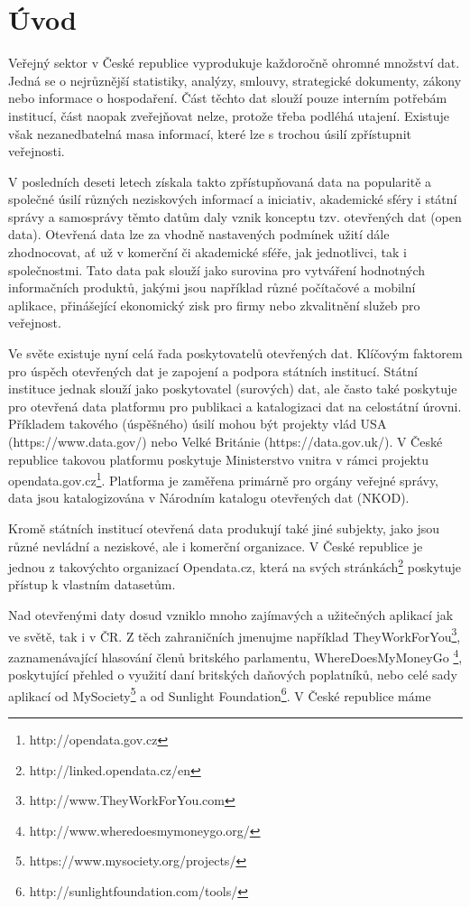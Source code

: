 \chapter*{Úvod}
Veřejný sektor v České republice vyprodukuje každoročně ohromné množství dat. Jedná se o nejrůznější statistiky, analýzy, smlouvy, strategické dokumenty, zákony nebo informace o hospodaření. Část těchto dat slouží pouze interním potřebám institucí, část naopak zveřejňovat nelze, protože třeba podléhá utajení. Existuje však nezanedbatelná masa informací, které lze s trochou úsilí zpřístupnit veřejnosti.

V posledních deseti letech získala takto zpřístupňovaná data na popularitě a společné úsilí různých neziskových informací a iniciativ, akademické sféry i státní správy a samosprávy těmto datům daly vznik konceptu tzv. otevřených dat (open data). Otevřená data lze za vhodně nastavených podmínek užití dále zhodnocovat, ať už v komerční či akademické sféře, jak jednotlivci, tak i společnostmi. Tato data pak slouží jako surovina pro vytváření hodnotných informačních produktů, jakými jsou například různé počítačové a mobilní aplikace, přinášející ekonomický zisk pro firmy nebo zkvalitnění služeb pro veřejnost.

Ve světe existuje nyní celá řada poskytovatelů otevřených dat. Klíčovým faktorem pro úspěch otevřených dat je zapojení a podpora státních institucí. Státní instituce jednak slouží jako poskytovatel (surových) dat, ale často také poskytuje pro otevřená data platformu pro publikaci a katalogizaci dat na celostátní úrovni. Příkladem takového (úspěšného) úsilí mohou být projekty vlád USA (https://www.data.gov/) nebo Velké Británie (https://data.gov.uk/). V České republice takovou platformu poskytuje Ministerstvo vnitra v rámci projektu opendata.gov.cz\footnote{http://opendata.gov.cz}. Platforma je zaměřena primárně pro orgány veřejné správy, data jsou katalogizována v Národním katalogu otevřených dat (NKOD).

Kromě státních institucí otevřená data produkují také jiné subjekty, jako jsou různé nevládní a neziskové, ale i komerční organizace. V České republice je jednou z takovýchto organizací Opendata.cz, která na svých stránkách\footnote{http://linked.opendata.cz/en} poskytuje přístup k vlastním datasetům.

Nad otevřenými daty dosud vzniklo mnoho zajímavých a užitečných aplikací jak ve světě, tak i v ČR. Z těch zahraničních jmenujme například TheyWorkForYou\footnote{http://www.TheyWorkForYou.com}, zaznamenávající hlasování členů britského parlamentu, WhereDoesMyMoneyGo \footnote{http://www.wheredoesmymoneygo.org/}, poskytující přehled o využití daní britských daňových poplatníků, nebo celé sady aplikací od MySociety\footnote{https://www.mysociety.org/projects/} a od Sunlight Foundation\footnote{http://sunlightfoundation.com/tools/}. V České republice máme 


